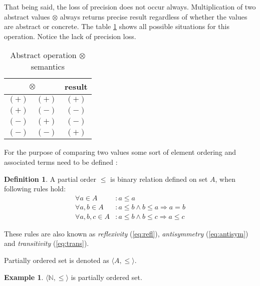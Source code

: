 \documentclass[12pt,final,oneside]{fithesis2}
\theoremstyle{definition}
\newtheorem{definition}{Definition}[chapter]
\newtheorem{example}{Example}[chapter]
\begin{document}
That being said, the loss of precision does not occur always. Multiplication
of two abstract values $\otimes$ always returns precise result regardless
of whether the values are abstract or concrete. The table
\ref{tab:abstractmult} shows all possible situations for this operation.
Notice the lack of precision loss.

\begin{table}[ht]
\centering
\begin{tabular}{c|c|c}
\multicolumn{2}{c|}{$\otimes$} & result \\
\hline
$(+)$ & $(+)$ & $(+)$ \\
$(+)$ & $(-)$ & $(-)$ \\
$(-)$ & $(+)$ & $(-)$ \\
$(-)$ & $(-)$ & $(+)$ \\
\end{tabular}
\caption{Abstract operation $\otimes$ semantics}
\label{tab:abstractmult}
\end{table}


For the purpose of comparing two values some sort of element ordering and
associated terms need to be defined \cite{Burris81-1}:

\begin{definition}
A partial order $\leq$ is binary relation defined on set $A$, when following
rules hold:
\begin{align}
\forall a \in A &: a \leq a \label{eq:refl} \\
\forall a, b \in A &: a \leq b \land b \leq a \Rightarrow a = b \label{eq:antisym} \\
\forall a, b, c \in A &: a \leq b \land b \leq c \Rightarrow a \leq c \label{eq:trans}
\end{align}

These rules are also known as \textit{reflexivity} (\ref{eq:refl}),
\textit{antisymmetry} (\ref{eq:antisym}) and \textit{transitivity} (\ref{eq:trans}).

Partially ordered set is denoted as $\langle A, \leq \rangle$.
\end{definition}

\begin{example}
$\langle \mathbb{N}, \leq \rangle$ is partially ordered set.
\end{example}
\end{document}
